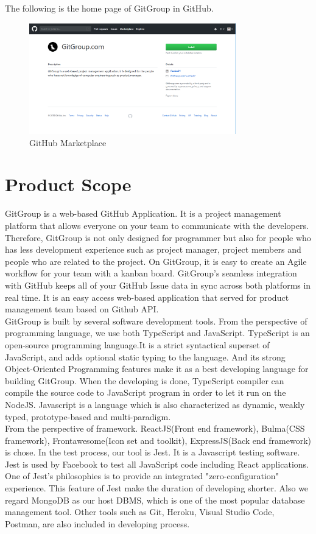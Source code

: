 \documentclass[12pt,a4paper]{report}
\begin{document}
The following is the home page of GitGroup in GitHub.
\begin{figure}[H]
	\centering
	\includegraphics[width=0.8\textwidth]{./pics/gitgrouphomepage.png}
	\caption{GitHub Marketplace}
\end{figure}
\section{Product Scope}
GitGroup is a web-based GitHub Application. It is a project management platform that allows everyone on your team to communicate with the developers. Therefore, GitGroup is not only designed for programmer but also for people who has less development experience such as project manager, project members and people who are related to the project. On GitGroup, it is easy to create an Agile workflow for your team with a kanban board. GitGroup's seamless integration with GitHub keeps all of your GitHub Issue data in sync across both platforms in real time.
It is an easy access web-based application that served for product management team based on Github API.\\
GitGroup is built by several software development tools. From the perspective of programming language, we use both TypeScript and JavaScript. TypeScript is an open-source programming language.It is a strict syntactical superset of JavaScript, and adds optional static typing to the language. And its strong Object-Oriented Programming features make it as a best developing language for building GitGroup. When the developing is done, TypeScript compiler can compile the source code to JavaScript program in order to let it run on the NodeJS. Javascript is a language which is also characterized as dynamic, weakly typed, prototype-based and multi-paradigm.\\
From the perspective of framework. ReactJS(Front end framework), Bulma(CSS framework), Frontawesome(Icon set and toolkit), ExpressJS(Back end framework) is chose. In the test process, our tool is Jest. It is a Javascript testing software. Jest is used by Facebook to test all JavaScript code including React applications. One of Jest's philosophies is to provide an integrated "zero-configuration" experience. This feature of Jest make the duration of developing shorter. Also we regard MongoDB as our host DBMS, which is one of the most popular database management tool. Other tools such as Git, Heroku, Visual Studio Code, Postman, are also included in developing process.\\
\end{document}
